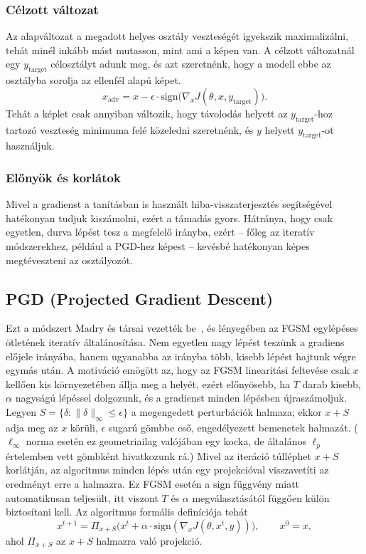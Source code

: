\subsubsection{Célzott változat}
Az alapváltozat a megadott helyes osztály veszteségét igyekszik maximalizálni, tehát minél inkább mást mutasson, mint ami a 
képen van. 
A célzott változatnál egy $y_{\mathrm{target}}$ célosztályt adunk meg, és azt szeretnénk, hogy a modell ebbe az osztályba 
sorolja az ellenfél alapú képet. 
\[
  x_{\mathrm{adv}} = x - \epsilon \cdot \mathrm{sign}\big(\nabla_x J(\theta, x, y_{\mathrm{target}})\big).
\]
Tehát a képlet csak annyiban változik, hogy távolodás helyett az $y_{\mathrm{target}}$-hoz tartozó veszteség minimuma felé 
közeledni szeretnénk, és $y$ helyett $y_{\mathrm{target}}$-ot használjuk. 

\subsubsection{Előnyök és korlátok}
Mivel a gradienst a tanításban is használt hiba-visszaterjesztés segítségével hatékonyan tudjuk kiszámolni, ezért a támadás 
gyors. 
Hátránya, hogy csak egyetlen, durva lépést tesz a megfelelő irányba, ezért -- főleg az iteratív módszerekhez, például a PGD-hez 
képest -- kevésbé hatékonyan képes megtéveszteni az osztályozót. 

\subsection{PGD (Projected Gradient Descent)}
Ezt a módszert Madry és társai vezették be~\cite{madry2018towards}, és lényegében az FGSM egylépéses ötletének iteratív 
általánosítása. 
Nem egyetlen nagy lépést teszünk a gradiens előjele irányába, hanem ugyanabba az irányba több, kisebb lépést hajtunk végre 
egymás után. 
A motiváció emögött az, hogy az FGSM linearitási feltevése csak $x$ kellően kis környezetében állja meg a helyét, ezért 
előnyösebb, ha $T$ darab kisebb, $\alpha$ nagyságú lépéssel dolgozunk, és a gradienst minden lépésben újraszámoljuk. 
Legyen $S = \{\delta : \|\delta\|_\infty \leq \epsilon\}$ a megengedett perturbációk halmaza; ekkor $x+S$ adja meg az $x$ 
körüli, $\epsilon$ sugarú gömbbe eső, engedélyezett bemenetek halmazát. 
($\ell_\infty$ norma esetén ez geometriailag valójában egy kocka, de általános $\ell_p$ értelemben vett gömbként hivatkozunk rá.) 
Mivel az iteráció túlléphet $x+S$ korlátján, az 
algoritmus minden lépés után egy projekcióval visszavetíti az eredményt erre a halmazra. 
Ez FGSM esetén a $\mathrm{sign}$ függvény miatt automatikusan teljesült, itt viszont $T$ és $\alpha$ megválasztásától függően 
külön biztosítani kell. 
Az algoritmus formális definíciója tehát 
\[
  x^{t+1} = \Pi_{x+S}\big(x^t + \alpha \cdot \mathrm{sign}(\nabla_x J(\theta, x^t, y))\big), \qquad x^0 = x,
\]
ahol $\Pi_{x+S}$ az $x+S$ halmazra való projekció. 

